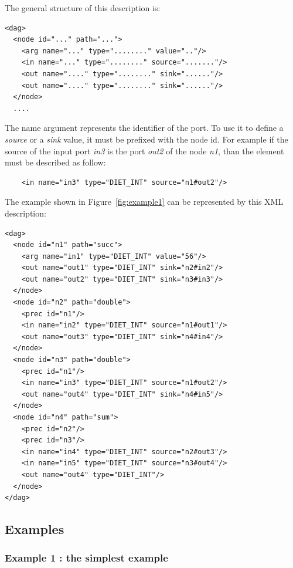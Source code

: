 The general structure of this description is:

\begin{verbatim}
<dag>
  <node id="..." path="...">
    <arg name="..." type="........" value=".."/>
    <in name="..." type="........" source="......."/>
    <out name="...." type="........" sink="......"/>
    <out name="...." type="........" sink="......"/>
  </node>
  ....
\end{verbatim}

The name argument represents the identifier of the port. To use it to
define a \textit{source} or a \textit{sink} value, it must be prefixed
with the node id. For example if the source of the input port
\textit{in3} is the port \textit{out2} of the node \textit{n1}, than
the element must be described as follow:

\begin{verbatim}
    <in name="in3" type="DIET_INT" source="n1#out2"/>
\end{verbatim}

The example shown in Figure~\ref{fig:example1} can be represented by
this XML description:

\begin{verbatim}
<dag>
  <node id="n1" path="succ">
    <arg name="in1" type="DIET_INT" value="56"/>
    <out name="out1" type="DIET_INT" sink="n2#in2"/>
    <out name="out2" type="DIET_INT" sink="n3#in3"/>
  </node>
  <node id="n2" path="double">
    <prec id="n1"/>
    <in name="in2" type="DIET_INT" source="n1#out1"/>
    <out name="out3" type="DIET_INT" sink="n4#in4"/>
  </node>
  <node id="n3" path="double">
    <prec id="n1"/>
    <in name="in3" type="DIET_INT" source="n1#out2"/>
    <out name="out4" type="DIET_INT" sink="n4#in5"/>
  </node>
  <node id="n4" path="sum">
    <prec id="n2"/>
    <prec id="n3"/>
    <in name="in4" type="DIET_INT" source="n2#out3"/>
    <in name="in5" type="DIET_INT" source="n3#out4"/>
    <out name="out4" type="DIET_INT"/>
  </node>
</dag>
\end{verbatim}

\subsection{Examples}
\label{sec:examples}


\subsubsection{Example 1 : the simplest example}
\label{sec:ex1}

